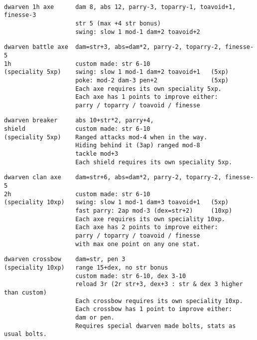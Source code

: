 \

\small \begin{samepage} \begin{verbatim}
dwarven 1h axe      dam 8, abs 12, parry-3, toparry-1, toavoid+1, finesse-3
                    str 5 (max +4 str bonus)
                    swing: slow 1 mod-1 dam+2 toavoid+2
\end{verbatim} \blocklistgap \begin{verbatim}
dwarven battle axe  dam=str+3, abs=dam*2, parry-2, toparry-2, finesse-5
1h                  custom made: str 6-10
(speciality 5xp)    swing: slow 1 mod-1 dam+2 toavoid+1   (5xp)
                    poke: mod-2 dam-3 pen+2               (5xp)
                    Each axe requires its own speciality 5xp.
                    Each axe has 1 points to improve either: 
                    parry / toparry / toavoid / finesse
\end{verbatim} \blocklistgap \begin{verbatim}
dwarven breaker     abs 10+str*2, parry+4,
shield              custom made: str 6-10
(speciality 5xp)    Ranged attacks mod-4 when in the way.
                    Hiding behind it (3ap) ranged mod-8
                    tackle mod+3
                    Each shield requires its own speciality 5xp.
\end{verbatim} \blocklistgap \begin{verbatim}
dwarven clan axe    dam=str+6, abs=dam*2, parry-2, toparry-2, finesse-5
2h                  custom made: str 6-10
(speciality 10xp)   swing: slow 1 mod-1 dam+3 toavoid+1   (5xp)
                    fast parry: 2ap mod-3 (dex=str+2)     (10xp)
                    Each axe requires its own speciality 10xp.
                    Each axe has 2 points to improve either: 
                    parry / toparry / toavoid / finesse
                    with max one point on any one stat.
\end{verbatim} \blocklistgap \begin{verbatim}
dwarven crossbow    dam=str, pen 3
(speciality 10xp)   range 15+dex, no str bonus
                    custom made: str 6-10, dex 3-10
                    reload 3r (2r str+3, dex+3 : str & dex 3 higher than custom)
                    Each crossbow requires its own speciality 10xp.
                    Each crossbow has 1 point to improve either:
                    dam or pen.
                    Requires special dwarven made bolts, stats as usual bolts.
\end{verbatim} \end{samepage} \normalsize

